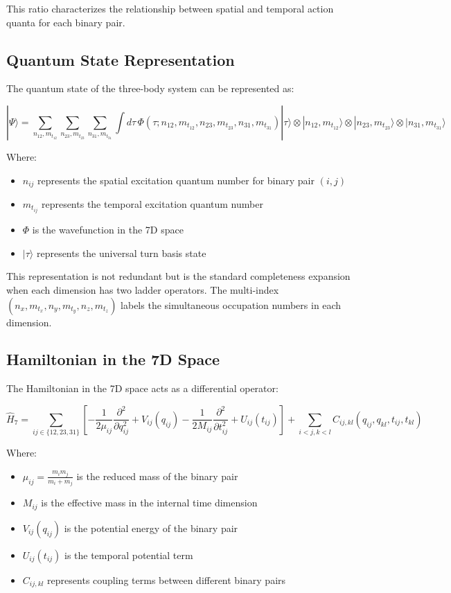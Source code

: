 \documentclass{article}
\begin{document}
This ratio characterizes the relationship between spatial and temporal action quanta for each binary pair.

\subsection{Quantum State Representation}

The quantum state of the three-body system can be represented as:

\begin{equation}
|\Psi\rangle = \sum_{n_{12},m_{t_{12}}} \sum_{n_{23},m_{t_{23}}} \sum_{n_{31},m_{t_{31}}} \int d\tau \, \Phi(\tau; n_{12}, m_{t_{12}}, n_{23}, m_{t_{23}}, n_{31}, m_{t_{31}}) |\tau\rangle \otimes |n_{12}, m_{t_{12}}\rangle \otimes |n_{23}, m_{t_{23}}\rangle \otimes |n_{31}, m_{t_{31}}\rangle
\end{equation}

Where:
\begin{itemize}
\item $n_{ij}$ represents the spatial excitation quantum number for binary pair $(i,j)$
\item $m_{t_{ij}}$ represents the temporal excitation quantum number
\item $\Phi$ is the wavefunction in the 7D space
\item $|\tau\rangle$ represents the universal turn basis state
\end{itemize}

This representation is not redundant but is the standard completeness expansion when each dimension has two ladder operators. The multi-index $(n_x, m_{t_x}, n_y, m_{t_y}, n_z, m_{t_z})$ labels the simultaneous occupation numbers in each dimension.

\subsection{Hamiltonian in the 7D Space}

The Hamiltonian in the 7D space acts as a differential operator:

\begin{equation}
\hat{H}_7 = \sum_{ij \in \{12,23,31\}} \left[-\frac{1}{2\mu_{ij}}\frac{\partial^2}{\partial q_{ij}^2} + V_{ij}(q_{ij}) - \frac{1}{2M_{ij}}\frac{\partial^2}{\partial t_{ij}^2} + U_{ij}(t_{ij})\right] + \sum_{i<j,k<l} C_{ij,kl}(q_{ij},q_{kl},t_{ij},t_{kl})
\end{equation}

Where:
\begin{itemize}
\item $\mu_{ij} = \frac{m_i m_j}{m_i+m_j}$ is the reduced mass of the binary pair
\item $M_{ij}$ is the effective mass in the internal time dimension
\item $V_{ij}(q_{ij})$ is the potential energy of the binary pair
\item $U_{ij}(t_{ij})$ is the temporal potential term
\item $C_{ij,kl}$ represents coupling terms between different binary pairs
\end{itemize}
\end{document}
